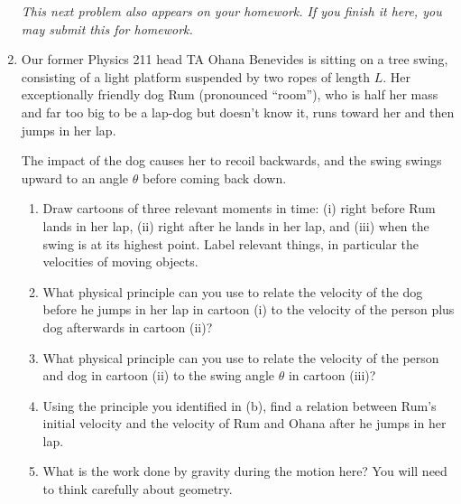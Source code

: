 \documentclass[12pt]{article}
\begin{document}
\begin{enumerate}
\it This next problem also appears on your homework. If you finish it here, you may submit this for homework.

\rm

\item Our former Physics 211 head TA Ohana Benevides is sitting on a tree swing, consisting of a light platform suspended by two ropes of length $L$. Her exceptionally friendly dog Rum (pronounced ``room''), who is half her mass and far too big to be a lap-dog but doesn't know it, runs toward her and then jumps in her lap.

The impact of the dog causes her to recoil backwards, and the swing swings upward to an angle $\theta$ before coming back down.

\begin{enumerate}

\item Draw cartoons of three relevant moments in time: (i) right before Rum lands in her lap, (ii) right after he lands in her lap, and (iii) when the swing is at its highest point. Label relevant things, in particular the velocities
of moving objects.

\vspace{3.5in}

\newpage

\item What physical principle can you use to relate the velocity of the dog before he jumps in her lap in cartoon (i) to the velocity of the person plus dog afterwards in cartoon (ii)?

\vspace{1in}

\item What physical principle can you use to relate the velocity of the person and dog in cartoon (ii) to the swing angle $\theta$ in cartoon (iii)?

\vspace{1in}

\item Using the principle you identified in (b), find a relation between Rum's initial velocity and the velocity of Rum and Ohana after he jumps in her lap.

\vspace{2in}
\newpage


\item What is the work done by gravity during the motion here? You will need to think carefully about geometry.

\vspace{3in}


\end{enumerate}
\end{enumerate}
\end{document}

